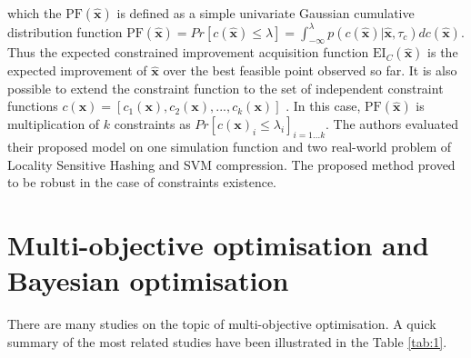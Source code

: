 which the $\mathrm{PF}(\hat{\textbf{x}})$ is defined as a simple univariate Gaussian cumulative distribution function $\mathrm{PF}(\hat{\textbf{x}}) = Pr[{c}(\hat{\textbf{x}}) \leq \lambda] = \int_{-\infty}^{\lambda} p(c(\hat{\textbf{x}})|\hat{\textbf{x}},\tau_c) dc(\hat{\textbf{x}})$. 
Thus the expected constrained improvement acquisition function $\mathrm{EI}_C(\hat{\textbf{x}})$ is the expected improvement of $\hat{\textbf{x}}$ over the best feasible point observed so far. It is also possible to extend the constraint function to the set of independent constraint functions $c(\textbf{x}) = [c_1(\textbf{x}), c_2(\textbf{x}),...,c_k(\textbf{x})]$ \cite{gardner2014bayesian}. In this case, $\mathrm{PF}(\hat{\textbf{x}})$ is multiplication of $k$ constraints as $Pr[c(\textbf{x})_i \leq \lambda_i]_{i=1...k}$. The authors evaluated their proposed model on one simulation function and two real-world problem of Locality Sensitive Hashing and SVM‌ compression. The proposed method proved to be robust in the case of constraints existence.

\section{Multi-objective optimisation and Bayesian optimisation}
There are many studies on the topic of multi-objective optimisation. A quick summary of the most related studies have been illustrated in the Table \ref{tab:1}.

